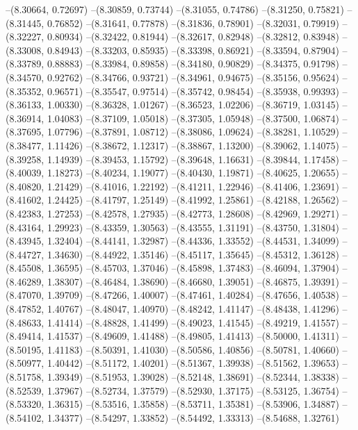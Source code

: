 --(8.30664, 0.72697)
--(8.30859, 0.73744)
--(8.31055, 0.74786)
--(8.31250, 0.75821)
--(8.31445, 0.76852)
--(8.31641, 0.77878)
--(8.31836, 0.78901)
--(8.32031, 0.79919)
--(8.32227, 0.80934)
--(8.32422, 0.81944)
--(8.32617, 0.82948)
--(8.32812, 0.83948)
--(8.33008, 0.84943)
--(8.33203, 0.85935)
--(8.33398, 0.86921)
--(8.33594, 0.87904)
--(8.33789, 0.88883)
--(8.33984, 0.89858)
--(8.34180, 0.90829)
--(8.34375, 0.91798)
--(8.34570, 0.92762)
--(8.34766, 0.93721)
--(8.34961, 0.94675)
--(8.35156, 0.95624)
--(8.35352, 0.96571)
--(8.35547, 0.97514)
--(8.35742, 0.98454)
--(8.35938, 0.99393)
--(8.36133, 1.00330)
--(8.36328, 1.01267)
--(8.36523, 1.02206)
--(8.36719, 1.03145)
--(8.36914, 1.04083)
--(8.37109, 1.05018)
--(8.37305, 1.05948)
--(8.37500, 1.06874)
--(8.37695, 1.07796)
--(8.37891, 1.08712)
--(8.38086, 1.09624)
--(8.38281, 1.10529)
--(8.38477, 1.11426)
--(8.38672, 1.12317)
--(8.38867, 1.13200)
--(8.39062, 1.14075)
--(8.39258, 1.14939)
--(8.39453, 1.15792)
--(8.39648, 1.16631)
--(8.39844, 1.17458)
--(8.40039, 1.18273)
--(8.40234, 1.19077)
--(8.40430, 1.19871)
--(8.40625, 1.20655)
--(8.40820, 1.21429)
--(8.41016, 1.22192)
--(8.41211, 1.22946)
--(8.41406, 1.23691)
--(8.41602, 1.24425)
--(8.41797, 1.25149)
--(8.41992, 1.25861)
--(8.42188, 1.26562)
--(8.42383, 1.27253)
--(8.42578, 1.27935)
--(8.42773, 1.28608)
--(8.42969, 1.29271)
--(8.43164, 1.29923)
--(8.43359, 1.30563)
--(8.43555, 1.31191)
--(8.43750, 1.31804)
--(8.43945, 1.32404)
--(8.44141, 1.32987)
--(8.44336, 1.33552)
--(8.44531, 1.34099)
--(8.44727, 1.34630)
--(8.44922, 1.35146)
--(8.45117, 1.35645)
--(8.45312, 1.36128)
--(8.45508, 1.36595)
--(8.45703, 1.37046)
--(8.45898, 1.37483)
--(8.46094, 1.37904)
--(8.46289, 1.38307)
--(8.46484, 1.38690)
--(8.46680, 1.39051)
--(8.46875, 1.39391)
--(8.47070, 1.39709)
--(8.47266, 1.40007)
--(8.47461, 1.40284)
--(8.47656, 1.40538)
--(8.47852, 1.40767)
--(8.48047, 1.40970)
--(8.48242, 1.41147)
--(8.48438, 1.41296)
--(8.48633, 1.41414)
--(8.48828, 1.41499)
--(8.49023, 1.41545)
--(8.49219, 1.41557)
--(8.49414, 1.41537)
--(8.49609, 1.41488)
--(8.49805, 1.41413)
--(8.50000, 1.41311)
--(8.50195, 1.41183)
--(8.50391, 1.41030)
--(8.50586, 1.40856)
--(8.50781, 1.40660)
--(8.50977, 1.40442)
--(8.51172, 1.40201)
--(8.51367, 1.39938)
--(8.51562, 1.39653)
--(8.51758, 1.39349)
--(8.51953, 1.39028)
--(8.52148, 1.38691)
--(8.52344, 1.38338)
--(8.52539, 1.37967)
--(8.52734, 1.37579)
--(8.52930, 1.37175)
--(8.53125, 1.36754)
--(8.53320, 1.36315)
--(8.53516, 1.35858)
--(8.53711, 1.35381)
--(8.53906, 1.34887)
--(8.54102, 1.34377)
--(8.54297, 1.33852)
--(8.54492, 1.33313)
--(8.54688, 1.32761)

